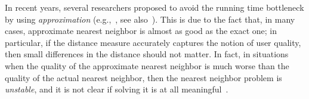 \documentclass[12pt]{article}
\begin{document}
In recent years, several researchers   proposed to avoid the running time bottleneck by using {\em approximation} (e.g.,~\cite{AMNSW,Kl,IM,KOR,HP}, see 
also~\cite{NIPS}).
This is due to the fact that, in many cases, approximate nearest neighbor is almost as good as the exact one; in particular, if the distance measure accurately captures the notion of user quality, then small differences in the distance should not matter.
In fact, in situations when the quality of the approximate nearest neighbor is much worse than the quality of  the actual nearest neighbor,
then the nearest neighbor problem is {\em unstable}, and it is not clear if solving it is at all meaningful~\cite{BGRS,HAK}.

\end{document}

